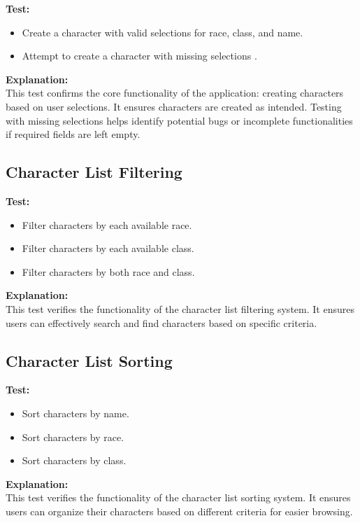 \documentclass{article}
\begin{document}
\textbf{Test:}
\begin{itemize}
    \item Create a character with valid selections for race, class, and name.
    \item Attempt to create a character with missing selections .
\end{itemize}

\textbf{Explanation:}\\
This test confirms the core functionality of the application: creating characters based on user selections. It ensures characters are created as intended. Testing with missing selections helps identify potential bugs or incomplete functionalities if required fields are left empty.

\subsection{Character List Filtering}

\textbf{Test:}
\begin{itemize}
    \item Filter characters by each available race.
    \item Filter characters by each available class.
    \item Filter characters by both race and class.
\end{itemize}

\textbf{Explanation:}\\
This test verifies the functionality of the character list filtering system. It ensures users can effectively search and find characters based on specific criteria.

\subsection{Character List Sorting}

\textbf{Test:}
\begin{itemize}
    \item Sort characters by name.
    \item Sort characters by race.
    \item Sort characters by class.
\end{itemize}

\textbf{Explanation:}\\
This test verifies the functionality of the character list sorting system. It ensures users can organize their characters based on different criteria for easier browsing.
\end{document}
